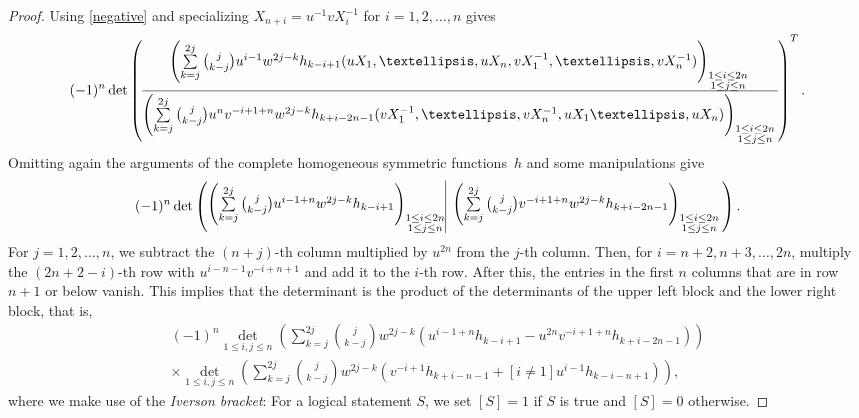 \documentclass[12pt]{amsart}
\theoremstyle{definition}
\numberwithin{equation}{section}
\begin{document}
\begin{proof}
	Using \eqref{negative}  and specializing $X_{n+i} = u^{-1} v X_i^{-1}$ for $i=1,2,\ldots,n$ gives
		\begin{equation*}
			(-1)^n
			\det \left( 
			\begin{array}{@{}c@{}} 
				\left( \sum\limits_{k=j}^{2j} \binom{j}{k-j} u^{i-1}  w^{2j-k}   
				h_{k-i+1}(u X_1,\ldots,u X_{n},v X_1^{-1},\ldots,v X_n^{-1})  \right)_{\substack{1 \le i \le 2n \\ 1 \le j \le n}}  \xmathstrut{1.2} \\\hline
				\left(  \sum\limits_{k=j}^{2j} \binom{j}{k-j} u^n v^{-i+1+n} w^{2j-k} h_{k+i-2n-1}(v X_1^{-1},\ldots,v X_n^{-1},u X_1\ldots,u X_{n}) 
				\right)_{\substack{1 \le i \le 2n \\ 1 \le j \le n}} \xmathstrut{1.2}
			\end{array} 
			\right)^T.
		\end{equation*} 
		Omitting again the arguments of the complete homogeneous symmetric functions~$h$ and some manipulations give 
		\begin{equation*} 
			(-1)^n
			\det \left( 
			\begin{array}{@{}c@{}|c@{}} 
				\left( \sum\limits_{k=j}^{2j} \binom{j}{k-j} u^{i-1+n}  w^{2j-k}   
				h_{k-i+1}  \right)_{\substack{1 \le i \le 2n \\ 1 \le j \le n}}  &
				\left(  \sum\limits_{k=j}^{2j} \binom{j}{k-j}  v^{-i+1+n} w^{2j-k} h_{k+i-2n-1}
				\right)_{\substack{1 \le i \le 2n \\ 1 \le j \le n}} \xmathstrut{1.2}
			\end{array} 
			\right).
		\end{equation*} 
		For $j=1,2,\ldots,n$, we subtract the $(n+j)$-th column multiplied by $u^{2n}$ from the $j$-th column.
		Then, for $i=n+2,n+3,\ldots,2n$, multiply the $(2n+2-i)$-th row with $u^{i-n-1} v^{-i+n+1}$ and add it to the $i$-th row. 
		After this, the entries in the first $n$ columns that are in row $n+1$ or below vanish. 
		This implies that the determinant is the product of the determinants of the upper left block and the lower right block, that is,
		\begin{multline*} 
			(-1)^n 
			\det_{1 \le i, j \le n } \left( \sum_{k=j}^{2j} \binom{j}{k-j} w^{2j-k}  \left(   u^{i-1+n} h_{k-i+1} - u^{2n} v^{-i+1+n} h_{k+i-2n-1} \right) \right) 
			\\
			\times 
			\det_{1 \le i,j \le n} \left(  \sum_{k=j}^{2j} \binom{j}{k-j} w^{2j-k} 
			(v^{-i+1}  h_{k+i-n-1} + [i \not=1] u^{i-1} h_{k-i-n+1} )  \right),
		\end{multline*} 
		where we make use of the \emph{Iverson bracket}: For a logical statement $S$, we set $\left[S\right]=1$ if $S$ is true and $\left[S\right]=0$ otherwise.
		

\end{proof}
\end{document}
